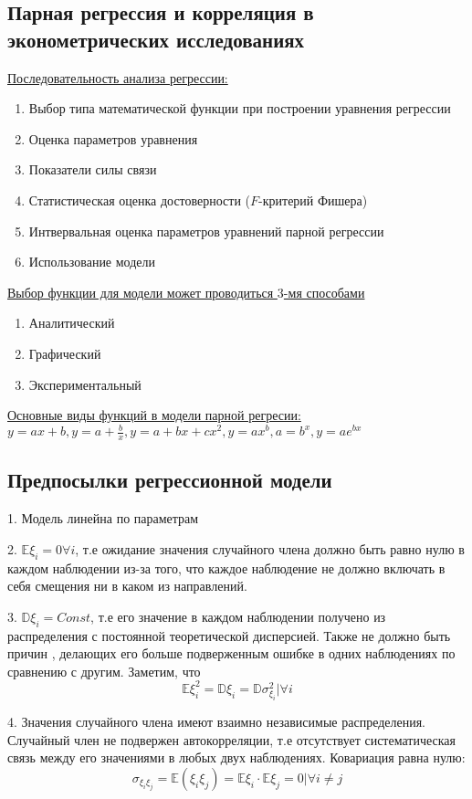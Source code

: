 \documentclass[aps,%
12pt,%
final,%
oneside,
onecolumn,%
musixtex, %
superscriptaddress,%
centertags]{article} %
\begin{document}
\subsection{Парная регрессия и корреляция в эконометрических исследованиях}
\underline{Последовательность анализа регрессии:}
\begin{enumerate}
	\item Выбор типа математической функции при построении уравнения регрессии
	\item Оценка параметров уравнения
	\item Показатели силы связи
	\item Статистическая оценка достоверности ($F$-критерий Фишера)
	\item Интвервальная оценка параметров уравнений парной регрессии
	\item Использование модели
\end{enumerate}

\underline{Выбор функции для модели может проводиться $3$-мя способами}
\begin{enumerate}
	\item Аналитический
	\item Графический
	\item Экспериментальный
\end{enumerate}

\underline{Основные виды функций в модели парной регресии:} \\ 
$y=ax+b, y=a+\frac{b}{x}, y=a+bx+cx^2,y=ax^b, a=b^x, y=ae^{bx} $
\subsection{Предпосылки регрессионной модели}
1. Модель линейна по параметрам

2. $\mathbb{E}\xi_i = 0 \forall i$, т.е ожидание значения случайного члена должно быть равно нулю в каждом наблюдении из-за того, что каждое наблюдение не должно включать в себя смещения ни в каком из направлений.

3. $\mathbb{D}\xi_i = Const $, т.е его значение в каждом наблюдении получено из распределения с постоянной теоретической дисперсией. Также не должно быть причин , делающих его больше подверженным ошибке в одних наблюдениях по сравнению с другим. Заметим, что $$\mathbb{E}\xi_i^2 = \mathbb{D}\xi_i = \mathbb{D}\sigma_{\xi_i}^2 | \forall i $$

4. Значения случайного члена имеют взаимно независимые распределения. Случайный член не подвержен автокорреляции, т.е отсутствует систематическая связь между его значениями в любых двух наблюдениях.
Ковариация равна нулю:
$$ \sigma_{\xi_{i}\xi_{j}} = \mathbb{E}(\xi_i\xi_j) = \mathbb{E}\xi_i \cdot \mathbb{E}\xi_j = 0 | \forall i \neq j $$
\end{document}
